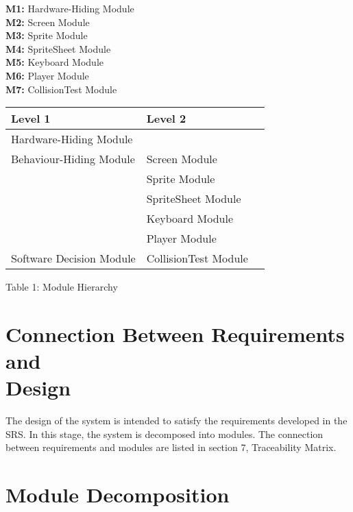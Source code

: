 \documentclass[12pt, letterpaper]{article}
\begin{document}
		\textbf{M1:} Hardware-Hiding Module\\
		
		\textbf{M2:} Screen Module\\
		
		\textbf{M3:} Sprite Module\\
		
		\textbf{M4:} SpriteSheet Module\\
		
		\textbf{M5:} Keyboard Module\\
		
		\textbf{M6:} Player Module\\
		
		\textbf{M7:} CollisionTest Module
	
	\begin{center}
		\begin{tabular}{ p{6cm} p{4cm} p{4cm}  }
			\hline
			\textbf{Level 1} & \textbf{Level 2} & \\ 
			\hline
			Hardware-Hiding Module \\ 
			\hline 
			Behaviour-Hiding Module & Screen Module &   \\ 
			& Sprite Module & \\
			& SpriteSheet Module & \\
			& Keyboard Module & \\
			& Player Module & \\

			\hline
			Software Decision Module & CollisionTest Module &   \\ 
			\hline
			
		\end{tabular}				
		\footnotesize Table 1: Module Hierarchy
	\end{center}
	
	\section{Connection Between Requirements and \\ Design}
	
	\indent \indent The design of the system is intended to satisfy the requirements developed in the SRS. In this stage, the system is decomposed into modules. The connection between requirements and modules are listed in section 7, Traceability Matrix.\\
	
	\section{Module Decomposition}
	
\end{document}
